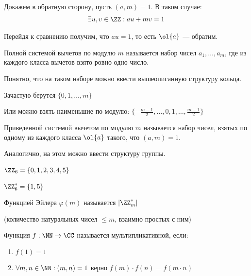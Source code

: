 Докажем в обратную сторону, пусть \( (a, m) = 1 \).
В таком случае:
\[
    \exists u, v \in \ZZ : au + mv = 1
\]

Перейдя к сравнению получим, что \( au = 1 \), то есть \( \ol{a} \) --- обратим.

\begin{defn}{}{}
    Полной системой вычетов по модулю \( m \) называется набор чисел \( a_1, \ldots, a_m \),
    где из каждого класса вычетов взято ровно одно число.

    Понятно, что на таком наборе можно ввести вышеописанную структуру кольца.
\end{defn}

\begin{example}{}{}
    Зачастую берутся \( \{ 0, 1, \ldots, m \} \)

    Или можно взять наименьшие по модулю:
    \(
        \displaystyle
        \{ -\frac{m - 1}{2}, \ldots, 0, 1, \ldots, \frac{m - 1}{2
        } \}
    \)
\end{example}

\begin{defn}{}{}
    Приведенной системой вычетом по модулю \( m \) называется набор чисел,
    взятых по одному из каждого класса \( \ol{a} \) такого, что \( (a, m) = 1 \).

    Аналогично, на этом можно ввести структуру группы.
\end{defn}

\begin{defn}{}{}
    \( \ZZ_6 = \{ 0, 1, 2, 3, 4, 5 \} \)

    \( \ZZ_6^* = \{ 1, 5 \} \)
\end{defn}

\begin{defn}{}{}
    Функцией Эйлера \( \varphi(m) \) называется \( \left| \ZZ_m^* \right| \)

    (количество натуральных чисел \( \leq m \), взаимно простых с ним)
\end{defn}

\begin{defn}{}{}
    Функция \( f : \NN \to \CC \) называется мультипликативной, если:
    \begin{enumerate}
        \item
            \( f(1) = 1 \)
        \item
            \( \forall m, n \in \NN : (m, n) = 1 \) верно \( f(m) \cdot f(n) = f(m \cdot n) \)
    \end{enumerate}
\end{defn}

